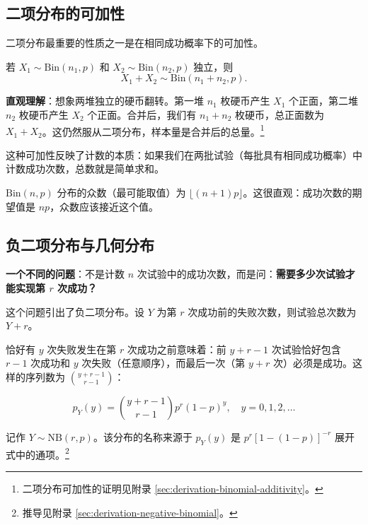 \subsection*{二项分布的可加性}

二项分布最重要的性质之一是在相同成功概率下的可加性。

\begin{theorem}[二项分布的可加性]\label{th:binomial-additivity-ch3}
若 $X_1 \sim \text{Bin}(n_1, p)$ 和 $X_2 \sim \text{Bin}(n_2, p)$ 独立，则
\[
X_1 + X_2 \sim \text{Bin}(n_1 + n_2, p).
\]
\end{theorem}

\textbf{直观理解}：想象两堆独立的硬币翻转。第一堆 $n_1$ 枚硬币产生 $X_1$ 个正面，第二堆 $n_2$ 枚硬币产生 $X_2$ 个正面。合并后，我们有 $n_1 + n_2$ 枚硬币，总正面数为 $X_1 + X_2$。这仍然服从二项分布，样本量是合并后的总量。\footnote{二项分布可加性的证明见附录 \cref{sec:derivation-binomial-additivity}。}

这种可加性反映了计数的本质：如果我们在两批试验（每批具有相同成功概率）中计数成功次数，总数就是简单求和。

\begin{example}\label{rmk:binomial-mode-ch3}
$\text{Bin}(n, p)$ 分布的众数（最可能取值）为 $\lfloor (n+1)p \rfloor$。这很直观：成功次数的期望值是 $np$，众数应该接近这个值。
\end{example}

\subsection{负二项分布与几何分布}\label{sub:negative-binomial-ch3}

\textbf{一个不同的问题}：不是计数 $n$ 次试验中的成功次数，而是问：\textbf{需要多少次试验才能实现第 $r$ 次成功？}

这个问题引出了负二项分布。设 $Y$ 为第 $r$ 次成功前的失败次数，则试验总次数为 $Y + r$。

恰好有 $y$ 次失败发生在第 $r$ 次成功之前意味着：前 $y+r-1$ 次试验恰好包含 $r-1$ 次成功和 $y$ 次失败（任意顺序），而最后一次（第 $y+r$ 次）必须是成功。这样的序列数为 $\binom{y+r-1}{r-1}$：

\begin{equation}\label{eq:negative-binomial-pmf-ch3}
p_Y(y) = \binom{y+r-1}{r-1} p^{r}(1-p)^{y}, \quad y = 0, 1, 2, \ldots
\end{equation}

记作 $Y \sim \text{NB}(r, p)$。该分布的名称来源于 $p_Y(y)$ 是 $p^{r}[1-(1-p)]^{-r}$ 展开式中的通项。\footnote{推导见附录 \cref{sec:derivation-negative-binomial}。}

